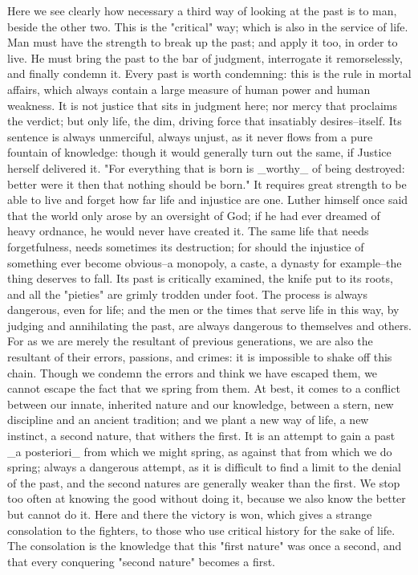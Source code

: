 Here we see clearly how necessary a third way of looking at the past
is to man, beside the other two. This is the "critical" way; which is
also in the service of life. Man must have the strength to break up
the past; and apply it too, in order to live. He must bring the past
to the bar of judgment, interrogate it remorselessly, and finally
condemn it. Every past is worth condemning: this is the rule in
mortal affairs, which always contain a large measure of human power
and human weakness. It is not justice that sits in judgment here; nor
mercy that proclaims the verdict; but only life, the dim, driving
force that insatiably desires--itself. Its sentence is always
unmerciful, always unjust, as it never flows from a pure fountain of
knowledge: though it would generally turn out the same, if Justice
herself delivered it. "For everything that is born is _worthy_ of
being destroyed: better were it then that nothing should be born." It
requires great strength to be able to live and forget how far life
and injustice are one. Luther himself once said that the world only
arose by an oversight of God; if he had ever dreamed of heavy
ordnance, he would never have created it. The same life that needs
forgetfulness, needs sometimes its destruction; for should the
injustice of something ever become obvious--a monopoly, a caste, a
dynasty for example--the thing deserves to fall. Its past is
critically examined, the knife put to its roots, and all the
"pieties" are grimly trodden under foot. The process is always
dangerous, even for life; and the men or the times that serve life in
this way, by judging and annihilating the past, are always dangerous
to themselves and others. For as we are merely the resultant of
previous generations, we are also the resultant of their errors,
passions, and crimes: it is impossible to shake off this chain.
Though we condemn the errors and think we have escaped them, we
cannot escape the fact that we spring from them. At best, it comes to
a conflict between our innate, inherited nature and our knowledge,
between a stern, new discipline and an ancient tradition; and we
plant a new way of life, a new instinct, a second nature, that
withers the first. It is an attempt to gain a past _a posteriori_
from which we might spring, as against that from which we do spring;
always a dangerous attempt, as it is difficult to find a limit to the
denial of the past, and the second natures are generally weaker than
the first. We stop too often at knowing the good without doing it,
because we also know the better but cannot do it. Here and there the
victory is won, which gives a strange consolation to the fighters, to
those who use critical history for the sake of life. The consolation
is the knowledge that this "first nature" was once a second, and that
every conquering "second nature" becomes a first.


